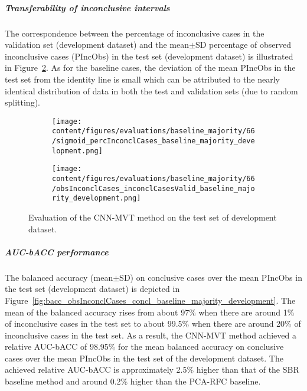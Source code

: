 \subparagraph{Transferability of inconclusive intervals}

The correspondence between the percentage of inconclusive cases in the validation set (development dataset) and 
the mean$\pm$SD percentage of observed inconclusive cases (PIncObs) in the test set (development dataset) 
is illustrated in Figure~\ref{fig:obsInconclCases_inconclCasesValid_baseline_majority_development}.
As for the baseline cases, the deviation of the mean PIncObs in the test set from the 
identity line is small which can be attributed to the nearly identical distribution of data in both the test and validation sets 
(due to random splitting).


\begin{figure}[ht]
  \begin{subfigure}{0.48\textwidth}
    \centering
    \texttt{[image: content/figures/evaluations/baseline\_majority/66/sigmoid\_percInconclCases\_baseline\_majority\_development.png]}
    \label{fig:baseline_majority_percInconclCases_development}
  \end{subfigure}
  \hfill
  \begin{subfigure}{0.495\textwidth}
    \centering
    \texttt{[image: content/figures/evaluations/baseline\_majority/66/obsInconclCases\_inconclCasesValid\_baseline\_majority\_development.png]}
    \label{fig:obsInconclCases_inconclCasesValid_baseline_majority_development}
  \end{subfigure}

  \caption{Evaluation of the CNN-MVT method on the test set of development dataset.}
  \label{fig:eval_cnn_mvt_dev}
\end{figure}


\subparagraph{AUC-bACC performance}

The balanced accuracy (mean$\pm$SD) on conclusive cases over the mean PIncObs
in the test set (development dataset) 
is depicted in Figure~\ref{fig:bacc_obsInconclCases_concl_baseline_majority_development}.
The mean of the balanced accuracy rises from about 97\% 
when there are around 1\% of inconclusive cases in the test set to about 99.5\% 
when there are around 20\% of inconclusive cases in the test set.
As a result, the CNN-MVT method achieved a relative AUC-bACC of 98.95\% for the mean balanced accuracy on conclusive cases
over the mean PIncObs in the test set of the development dataset.
The achieved relative AUC-bACC is approximately 2.5\% higher than that of the SBR baseline method 
and around 0.2\% higher than the PCA-RFC baseline.


